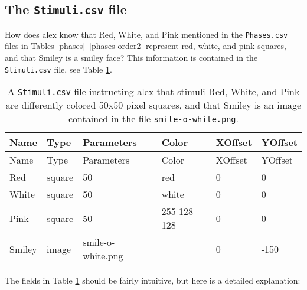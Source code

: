 \documentclass[11pt,]{article}
\begin{document}
\subsection{The \texttt{Stimuli.csv} file}\label{the-stimuli.csv-file}

How does alex know that Red, White, and Pink mentioned in the
\texttt{Phases.csv} files in Tables \ref{phases}--\ref{phases-order2}
represent red, white, and pink squares, and that Smiley is a smiley
face? This information is contained in the \texttt{Stimuli.csv} file,
see Table \ref{stimuli}.

\begin{longtable}[c]{@{}llllll@{}}
\caption{A \texttt{Stimuli.csv} file instructing alex that stimuli Red,
White, and Pink are differently colored 50x50 pixel squares, and that
Smiley is an image contained in the file \texttt{smile-o-white.png}.
\label{stimuli}}\tabularnewline
\toprule
Name & Type & Parameters & Color & XOffset & YOffset\tabularnewline
\midrule
\endfirsthead
\toprule
Name & Type & Parameters & Color & XOffset & YOffset\tabularnewline
\midrule
\endhead
Red & square & 50 & red & 0 & 0\tabularnewline
White & square & 50 & white & 0 & 0\tabularnewline
Pink & square & 50 & 255-128-128 & 0 & 0\tabularnewline
Smiley & image & smile-o-white.png & & 0 & -150\tabularnewline
\bottomrule
\end{longtable}

The fields in Table \ref{stimuli} should be fairly intuitive, but here
is a detailed explanation:
\end{document}
